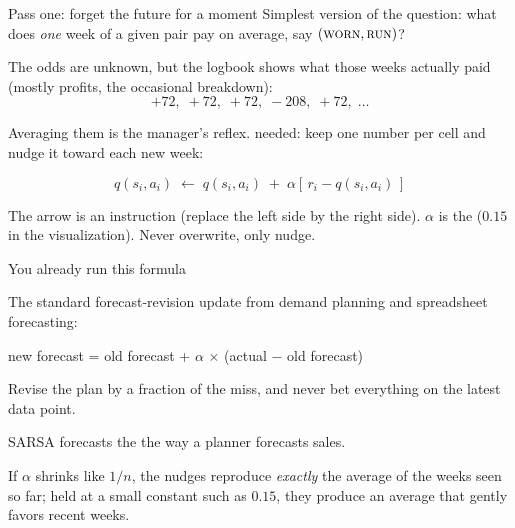\begin{frame}{Pass one: forget the future for a moment}
Simplest version of the question: what does \emph{one} week of a given pair pay on average, say $(\textsc{worn}, \textsc{run})$?
\begin{bullets}
\item The odds are unknown, but the logbook shows what those weeks actually paid (mostly profits, the occasional breakdown):
\[ +72,\; +72,\; +72,\; -208,\; +72,\; \ldots \]
\pause
\item Averaging them is the manager's reflex.  needed: keep one number per cell and nudge it toward each new week:
\end{bullets}
\begin{lbox}
\vspace{-2mm}
\[ q(s_i, a_i) \;\leftarrow\; q(s_i, a_i) \;+\; \alpha \left[\, r_i - q(s_i, a_i) \,\right] \]
\vspace{-5mm}
\end{lbox}
\begin{bullets}
\item The arrow is an instruction (replace the left side by the right side). $\alpha$ is the  ($0.15$ in the visualization). Never overwrite, only nudge.
\end{bullets}
\end{frame}

\begin{frame}{You already run this formula}
\begin{examplebox}
The standard forecast-revision update from demand planning and spreadsheet forecasting:
\begin{center}
new forecast \;=\; old forecast \;+\; $\alpha$ $\times$ (actual $-$ old forecast)
\end{center}
Revise the plan by a fraction of the miss, and never bet everything on the latest data point.
\end{examplebox}
\pause
\begin{bullets}
\item SARSA forecasts the  the way a planner forecasts sales.
\item If $\alpha$ shrinks like $1/n$, the nudges reproduce \emph{exactly} the average of the weeks seen so far; held at a small constant such as $0.15$, they produce an average that gently favors recent weeks.
\end{bullets}
\end{frame}

